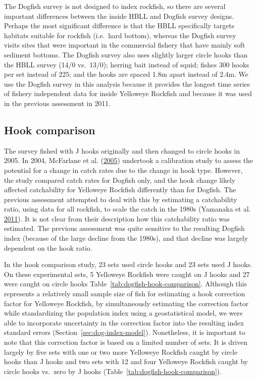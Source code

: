 \documentclass[11pt]{book}
\begin{document}
The Dogfish survey is not designed to index rockfish, so there are several important differences between the inside HBLL and Dogfish survey designs. Perhaps the most significant difference is that the HBLL specifically targets habitats suitable for rockfish (i.e.~hard bottom), whereas the Dogfish survey visits sites that were important in the commercial fishery that have mainly soft sediment bottoms. The Dogfish survey also uses slightly larger circle hooks than the HBLL survey (14/0 vs.~13/0); herring bait instead of squid; fishes 300 hooks per set instead of 225; and the hooks are spaced 1.8m apart instead of 2.4m. We use the Dogfish survey in this analysis because it provides the longest time series of fishery independent data for inside Yelloweye Rockfish and because it was used in the previous assessment in 2011.

\hypertarget{sec:dog-hook-comparison}{%
\subsection{Hook comparison}\label{sec:dog-hook-comparison}}

The survey fished with J hooks originally and then changed to circle hooks in 2005. In 2004, McFarlane et al. (\protect\hyperlink{ref-mcfarlane2005}{2005}) undertook a calibration study to assess the potential for a change in catch rates due to the change in hook type. However, the study compared catch rates for Dogfish only, and the hook change likely affected catchability for Yelloweye Rockfish differently than for Dogfish. The previous assessment attempted to deal with this by estimating a catchability ratio, using data for all rockfish, to scale the catch in the 1980s (Yamanaka et al. \protect\hyperlink{ref-yamanaka2011}{2011}). It is not clear from their description how this catchability ratio was estimated. The previous assessment was quite sensitive to the resulting Dogfish index (because of the large decline from the 1980s), and that decline was largely dependent on the hook ratio.

In the hook comparison study, 23 sets used circle hooks and 23 sets used J hooks. On these experimental sets, 5 Yelloweye Rockfish were caught on J hooks and 27 were caught on circle hooks Table~\ref{tab:dogfish-hook-comparison}. Although this represents a relatively small sample size of fish for estimating a hook correction factor for Yelloweye Rockfish, by simultaneously estimating the correction factor while standardizing the population index using a geostatistical model, we were able to incorporate uncertainty in the correction factor into the resulting index standard errors (Section~\ref{sec:dog-index-model}). Nonetheless, it is important to note that this correction factor is based on a limited number of sets. It is driven largely by five sets with one or two more Yelloweye Rockfish caught by circle hooks than J hooks and two sets with 12 and four Yelloweye Rockfish caught by circle hooks vs.~zero by J hooks (Table~\ref{tab:dogfish-hook-comparison}).
\end{document}
